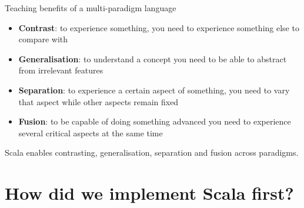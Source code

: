 \documentclass[aspectratio=169]{beamer}
\newcommand{\Section}[1]{\titleimagecolor{red}\section{#1}}
\newenvironment{Slide}[1]%
  {\begin{frame}[environment=Slide]{#1}}
  {\end{frame}}%
\begin{document}
\begin{Slide}{Teaching benefits of a multi-paradigm language}
\begin{minipage}{0.85\textwidth}
\begin{itemize}
    \begin{itemize}
      \item \textbf{Contrast}: to experience something, you need to experience something else to compare with    
      \item \textbf{Generalisation}: to understand a concept you need to be able to abstract from irrelevant features    
      \item \textbf{Separation}: to experience a certain aspect of something, you need to vary that aspect while other aspects remain fixed    
      \item \textbf{Fusion}: to be capable of doing something advanced you need to experience several critical aspects at the same time    
    \end{itemize}
  \end{itemize}
\end{minipage}

\vspace{1em} Scala enables contrasting, generalisation, separation and fusion across paradigms.

\end{Slide}

\Section{How did we implement Scala first?}
\end{document}
